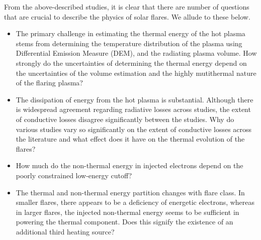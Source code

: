 From the above-described studies, it is clear that there are number of questions that are crucial to describe the physics of solar flares. We allude to these below. 


\begin{itemize}
    \item The primary challenge in estimating the thermal energy of the hot plasma stems from determining the temperature distribution of the plasma using Differential Emission Measure (DEM), and the radiating plasma volume. How strongly do the uncertainties of determining the thermal energy depend on the uncertainties of the volume estimation and the highly mutithermal nature of the flaring plasma? 
    \item The dissipation of energy from the hot plasma is substantial. Although there is widespread agreement regarding radiative losses across studies, the extent of conductive losses disagree significantly between the studies. Why do various studies vary so significantly on the extent of conductive losses across the literature and what effect does it have on the thermal evolution of the flares?
    \item How much do the non-thermal energy in injected electrons depend on the poorly constrained low-energy cutoff?
    \item The thermal and non-thermal energy partition changes with flare class. In smaller flares, there appears to be a deficiency of energetic electrons, whereas in larger flares, the injected non-thermal energy seems to be sufficient in powering the thermal component. Does this signify the existence of an additional third heating source?
\end{itemize}

